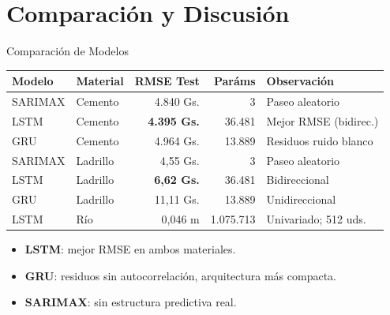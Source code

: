\documentclass[12pt, aspectratio=169]{beamer}
\begin{document}
\section{Comparaci\'on y Discusi\'on}

\begin{frame}{Comparaci\'on de Modelos}
\begin{table}[ht]
\centering
\small
\begin{tabular}{llrrl}
\toprule
\textbf{Modelo} & \textbf{Material} & \textbf{RMSE Test} & \textbf{Par\'ams} & \textbf{Observaci\'on} \\
\midrule
SARIMAX & Cemento  & 4.840 Gs.  & 3      & Paseo aleatorio \\
\rowcolor{verdeclaro} LSTM    & Cemento  & \textbf{4.395 Gs.}  & 36.481 & Mejor RMSE (bidirec.) \\
GRU     & Cemento  & 4.964 Gs.  & 13.889 & Residuos ruido blanco \\
\midrule
SARIMAX & Ladrillo & 4,55 Gs.   & 3      & Paseo aleatorio \\
\rowcolor{verdeclaro} LSTM    & Ladrillo & \textbf{6,62 Gs.}   & 36.481 & Bidireccional \\
GRU     & Ladrillo & 11,11 Gs.  & 13.889 & Unidireccional \\
\midrule
LSTM    & R\'io    & 0,046 m    & 1.075.713 & Univariado; 512 uds. \\
\bottomrule
\end{tabular}
\end{table}

\begin{itemize}\small
  \item \textbf{LSTM}: mejor RMSE en ambos materiales.
  \item \textbf{GRU}: residuos sin autocorrelaci\'on, arquitectura m\'as compacta.
  \item \textbf{SARIMAX}: sin estructura predictiva real.
\end{itemize}
\end{frame}
\end{document}
